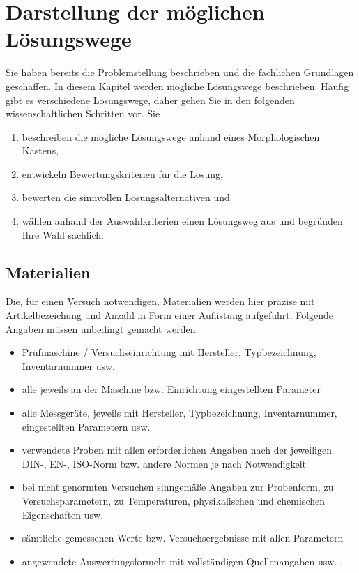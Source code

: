 \chapter{Darstellung der möglichen Lösungswege}
\label{cha:Loesungswege}

Sie haben bereits die Problemstellung beschrieben und die fachlichen Grundlagen geschaffen. In diesem Kapitel werden mögliche Lösungswege beschrieben. Häufig gibt es verschiedene Lösungswege, daher gehen Sie in den folgenden wissenschaftlichen Schritten vor. Sie
\begin{enumerate}
	\item beschreiben die mögliche Lösungswege anhand eines Morphologischen Kastens, 
	\item entwickeln Bewertungskriterien für die Lösung,
	\item bewerten die sinnvollen Lösungsalternativen und
	\item wählen anhand der Auswahlkriterien einen Lösungsweg aus und begründen Ihre Wahl sachlich.
\end{enumerate}

\section{Materialien}
Die, für einen Versuch notwendigen, Materialien werden hier präzise mit Artikelbezeichung und Anzahl in Form einer Auflistung aufgeführt. 
Folgende Angaben müssen unbedingt gemacht werden:

\begin{itemize}
	\item Prüfmaschine / Versuchseinrichtung mit Hersteller, Typbezeichnung, Inventarnummer usw.
	\item alle jeweils an der Maschine bzw. Einrichtung eingestellten Parameter
	\item alle Messgeräte, jeweils mit Hersteller, Typbezeichnung, Inventarnummer, eingestellten Parametern usw.
	\item verwendete Proben mit allen erforderlichen Angaben nach der jeweiligen DIN-, EN-, ISO-Norm bzw. andere Normen je nach Notwendigkeit
	\item bei nicht genormten Versuchen sinngemäße Angaben zur Probenform, zu Versuchsparametern, zu Temperaturen, physikalischen und chemischen Eigenschaften usw.
	\item sämtliche gemessenen Werte bzw. Versuchsergebnisse mit allen Parametern
	\item angewendete Auswertungsformeln mit vollständigen Quellenangaben usw. \cite[S.~24]{Hering2009}.
\end{itemize}

